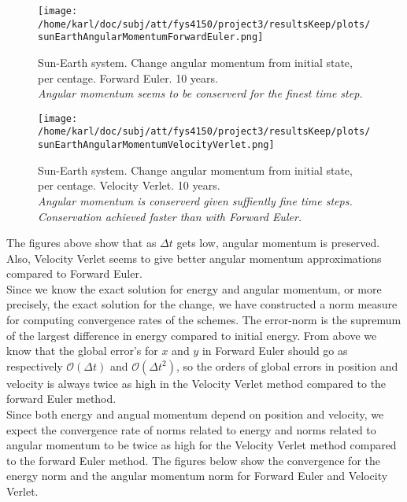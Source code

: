 \documentclass{article}
\begin{document}
\begin{minipage}{.45\textwidth} 
	\begin{figure}[H]
		\centering
		\texttt{[image: /home/karl/doc/subj/att/fys4150/project3/resultsKeep/plots/sunEarthAngularMomentumForwardEuler.png]}
		\caption{Sun-Earth system. Change angular momentum from initial state, per centage. Forward Euler. 10 years. \\ \textit{Angular momentum seems to be conserverd for the finest time step.}}
		\label{1}
	\end{figure}
\end{minipage}\hfill
\begin{minipage}{.45\textwidth} 
	\begin{figure}[H]
		\centering
		\texttt{[image: /home/karl/doc/subj/att/fys4150/project3/resultsKeep/plots/sunEarthAngularMomentumVelocityVerlet.png]}
		\caption{Sun-Earth system. Change angular momentum from initial state, per centage. Velocity Verlet. 10 years. \\ \textit{Angular momentum is conserverd given suffiently fine time steps. Conservation achieved faster than with Forward Euler.}}
		\label{1}
	\end{figure}
\end{minipage}\hfill
\vspace{2ex}

The figures above show that as $\Delta t$ gets low, angular momentum is preserved. Also, Velocity Verlet seems to give better angular momentum approximations compared to Forward Euler.\\

Since we know the exact solution for energy and angular momentum, or more precisely, the exact solution for the change, we have constructed a norm measure for computing convergence rates of the schemes. The error-norm is the supremum of the largest difference in energy compared to initial energy. From above we know that the global error's for $x$ and $y$ in Forward Euler should go as respectively $\mathcal{O}(\Delta t)$ and $\mathcal{O}(\Delta t^2)$, so the orders of global errors in position and velocity is always twice as high in the Velocity Verlet method compared to the forward Euler method. \\

Since both energy and angual momentum depend on position and velocity, we expect the convergence rate of norms related to energy and norms related to angular momentum to be twice as high for the Velocity Verlet method compared to the forward Euler method. The figures below show the convergence for the energy norm and the angular momentum norm for Forward Euler and Velocity Verlet.
\end{document}

